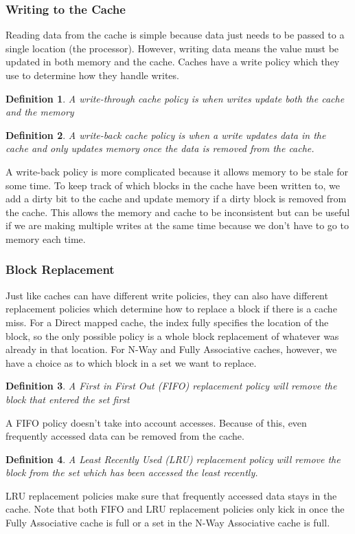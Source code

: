 \documentclass{article}
\newtheorem{definition}{Definition}
\begin{document}
\subsubsection{Writing to the Cache}
Reading data from the cache is simple because data just needs to be passed to a single location (the processor). However, writing data means the value must be updated in both
memory and the cache. Caches have a write policy which they use to determine how they handle writes.
\begin{definition}
    A write-through cache policy is when writes update both the cache and the memory
\end{definition}
\begin{definition}
    A write-back cache policy is when a write updates data in the cache and only updates memory once the data is removed from the cache.
\end{definition}
A write-back policy is more complicated because it allows memory to be stale for some time. To keep track of which blocks in the cache have been written to, we add a dirty bit to the cache and update
memory if a dirty block is removed from the cache. This allows the memory and cache to be inconsistent but can be useful if we are making multiple writes at the same time because we don't have to go to memory each time.
\subsubsection{Block Replacement}
Just like caches can have different write policies, they can also have different replacement policies which determine how to replace a block if there is a cache miss.
For a Direct mapped cache, the index fully specifies the location of the block, so the only possible policy is a whole block replacement of whatever was already in that location.
For N-Way and Fully Associative caches, however, we have a choice as to which block in a set we want to replace.
\begin{definition}
    A First in First Out (FIFO) replacement policy will remove the block that entered the set first
\end{definition}
A FIFO policy doesn't take into account accesses. Because of this, even frequently accessed data can be removed from the cache.
\begin{definition}
    A Least Recently Used (LRU) replacement policy will remove the block from the set which has been accessed the least recently.
\end{definition} 
LRU replacement policies make sure that frequently accessed data stays in the cache. Note that both FIFO and LRU replacement policies only kick in once the Fully Associative cache is full
or a set in the N-Way Associative cache is full.
\end{document}
